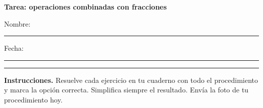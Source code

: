 \documentclass[11pt,a4paper]{article}
\begin{document}
{\LARGE\bfseries Tarea: operaciones combinadas con fracciones}

\vspace{10pt}
Nombre: \rule{9cm}{0.4pt} \hfill Fecha: \rule{3.5cm}{0.4pt}

\vspace{10pt}
{\color{verde}\rule{\textwidth}{1pt}}

\vspace{4pt}
\textbf{Instrucciones.} Resuelve cada ejercicio en tu cuaderno con todo el procedimiento y marca la opción correcta. Simplifica siempre el resultado. Envía la foto de tu procedimiento hoy.

\vspace{10pt}
\begin{enumerate}[label=\textbf{\arabic*.},leftmargin=*,itemsep=14pt]
\end{enumerate}
\end{document}
